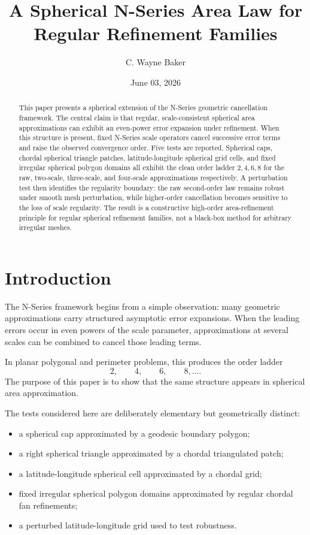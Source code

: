 \documentclass[11pt]{article}
\title{A Spherical N-Series Area Law for Regular Refinement Families}
\author{C. Wayne Baker}
\date{June 03, 2026}
\begin{document}
\maketitle

\begin{abstract}
This paper presents a spherical extension of the N-Series geometric
cancellation framework.  The central claim is that regular, scale-consistent
spherical area approximations can exhibit an even-power error expansion under
refinement.  When this structure is present, fixed N-Series scale operators
cancel successive error terms and raise the observed convergence order.  Five
tests are reported.  Spherical caps, chordal spherical triangle patches,
latitude-longitude spherical grid cells, and fixed irregular spherical
polygon domains all exhibit the clean order ladder $2,4,6,8$ for the raw,
two-scale, three-scale, and four-scale approximations respectively.  A
perturbation test then identifies the regularity boundary: the raw
second-order law remains robust under smooth mesh perturbation, while
higher-order cancellation becomes sensitive to the loss of scale regularity.
The result is a constructive high-order area-refinement principle for regular
spherical refinement families, not a black-box method for arbitrary irregular
meshes.
\end{abstract}

\section{Introduction}

The N-Series framework begins from a simple observation: many geometric
approximations carry structured asymptotic error expansions.  When the
leading errors occur in even powers of the scale parameter, approximations at
several scales can be combined to cancel those leading terms.

In planar polygonal and perimeter problems, this produces the order ladder
\[
  2,\qquad 4,\qquad 6,\qquad 8,\ldots .
\]
The purpose of this paper is to show that the same structure appears in
spherical area approximation.

The tests considered here are deliberately elementary but geometrically
distinct:

\begin{itemize}
\item a spherical cap approximated by a geodesic boundary polygon;
\item a right spherical triangle approximated by a chordal triangulated patch;
\item a latitude-longitude spherical cell approximated by a chordal grid;
\item fixed irregular spherical polygon domains approximated by regular
      chordal fan refinements;
\item a perturbed latitude-longitude grid used to test robustness.
\end{itemize}
\end{document}
